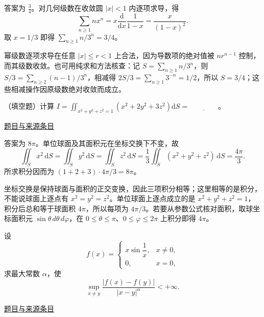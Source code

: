 \documentclass[12pt,fontset=fandol]{ctexart}
\begin{document}
\begin{solve}\label{ans:fin06-lo:2}

答案为 $\frac34$。对几何级数在收敛圆 $|x|<1$ 内逐项求导，得
\[
\sum_{n\ge1}nx^n=x\frac{\mathrm d}{\mathrm dx}\frac1{1-x}
=\frac{x}{(1-x)^2}.
\]
取 $x=1/3$ 即得 $\sum_{n\ge1}n/3^n=3/4$。

幂级数逐项求导在任意 $|x|\le r<1$ 上合法，因为导数项的绝对值被 $nr^{n-1}$ 控制，而其级数收敛。也可用纯求和方法核查：记 $S=\sum_{n\ge1}n/3^n$，则 $S/3=\sum_{n\ge2}(n-1)/3^n$，相减得 $2S/3=\sum_{n\ge1}3^{-n}=1/2$，所以 $S=3/4$；这些相减操作因原级数绝对收敛而成立。

\end{solve}

\begin{example}[来源序号3]\label{ex:fin06-lo:3}\label{pr:fin06-lo:3}

（填空题）计算 $I=\iint_{x^2+y^2+z^2=1}\left(x^2+2y^2+3z^2\right)\mathrm{d}S=\underline{\qquad\qquad}$。

\par\href{https://github.com/lzxcr/cmc-mathematics/blob/64916fa1fdbc3e444a652eca204d5669058ee321/src/problems/finals/06/03.md}{题目与来源条目}

\end{example}

\begin{solve}\label{ans:fin06-lo:3}

答案为 $8\pi$。单位球面及其面积元在坐标交换下不变，故
\[
\iint_Sx^2\,\mathrm dS=\iint_Sy^2\,\mathrm dS
=\iint_Sz^2\,\mathrm dS
=\frac13\iint_S(x^2+y^2+z^2)\,\mathrm dS=\frac{4\pi}{3}.
\]
所求积分因而为 $(1+2+3)\cdot4\pi/3=8\pi$。

坐标交换是保持球面与面积的正交变换，因此三项积分相等；这里相等的是积分，不能说球面上逐点有 $x^2=y^2=z^2$。单位球面上逐点成立的是 $x^2+y^2+z^2=1$，积分后总和等于球面积 $4\pi$，所以每项为 $4\pi/3$。若要从参数公式核对面积，取球坐标面积元 $\sin\theta\,d\theta\,d\varphi$，在 $0\le\theta\le\pi$、$0\le\varphi\le2\pi$ 上积分即得 $4\pi$。

\end{solve}

\begin{example}[来源序号7]\label{ex:fin06-lo:7}\label{pr:fin06-lo:7}

设
\[
f(x)=\begin{cases}x\sin\dfrac{1}{x},&x\ne0,\\0,&x=0,\end{cases}
\]
求最大常数 $\alpha$，使
\[
\sup_{x\ne y}\frac{|f(x)-f(y)|}{|x-y|^{\alpha}}<+\infty .
\]

\par\href{https://github.com/lzxcr/cmc-mathematics/blob/64916fa1fdbc3e444a652eca204d5669058ee321/src/problems/finals/06/07.md}{题目与来源条目}

\end{example}
\end{document}

